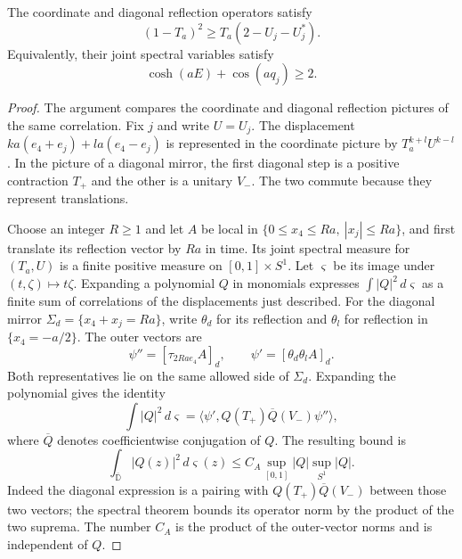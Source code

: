 \documentclass[11pt,letterpaper,reqno]{amsart}
\makeatletter
\theoremstyle{definition}
\newcommand{\ms@minorstart}{%
  \pushQED{\qed}\renewcommand{\qedsymbol}{$\blacksquare$}}
\newenvironment{proposition}[1][]{\ms@minorstart\ms@proposition[#1]}
  {\popQED\endms@proposition}
\theoremstyle{remark}
\makeatother
\begin{document}
\begin{proposition}[The lattice cone]\label{prop:lattice-cone}
The coordinate and diagonal reflection operators satisfy
\begin{equation}\label{eq:lattice-cone}
 (1-T_a)^2\ge T_a(2-U_j-U_j^*).
\end{equation}
Equivalently, their joint spectral variables satisfy
\[
 \cosh(aE)+\cos(aq_j)\ge2.
\]
\end{proposition}

\begin{proof}
The argument compares the coordinate and diagonal reflection pictures
of the same correlation. Fix $j$ and write $U=U_j$. The displacement
$ka(e_4+e_j)+la(e_4-e_j)$ is represented in the coordinate picture by
$T_a^{k+l}U^{k-l}$. In the picture of a diagonal mirror, the first
diagonal step is a positive contraction $T_+$ and the other is a
unitary $V_-$. The two commute because they represent translations.

Choose an integer $R\ge1$ and let $A$ be local in
$\{0\le x_4\le Ra,\ |x_j|\le Ra\}$, and first translate its
reflection vector by $Ra$ in time.
Its joint spectral measure for $(T_a,U)$ is a finite positive measure
on $[0,1]\times S^1$. Let $\varsigma$ be its image under
$(t,\zeta)\mapsto t\zeta$. Expanding a polynomial $Q$ in monomials
expresses $\int|Q|^2\,d\varsigma$ as a finite sum of correlations of
the displacements just described. For the diagonal mirror
$\Sigma_d=\{x_4+x_j=Ra\}$, write $\theta_d$ for its reflection and
$\theta_l$ for reflection in $\{x_4=-a/2\}$. The outer vectors are
\[
 \psi''=[\tau_{2Rae_4}A]_d,\qquad
 \psi'=[\theta_d\theta_l A]_d.
\]
Both representatives lie on the same allowed side of $\Sigma_d$.
Expanding the polynomial gives the identity
\[
 \int|Q|^2\,d\varsigma
 =\langle\psi',Q(T_+)\overline Q(V_-)\psi''\rangle,
\]
where $\overline Q$ denotes coefficientwise conjugation of $Q$.
The resulting bound is
\begin{equation}\label{eq:slit-disc-bound}
 \int_{\overline{\mathbb D}}|Q(z)|^2\,d\varsigma(z)
 \le C_A\sup_{[0,1]}|Q|\sup_{S^1}|Q|.
\end{equation}
Indeed the diagonal expression is a pairing with
$Q(T_+)\overline Q(V_-)$ between those two vectors; the spectral
theorem bounds its operator norm by the product of the two suprema.
The number $C_A$ is the product of the outer-vector norms and is
independent of $Q$.


\end{proof}
\end{document}
